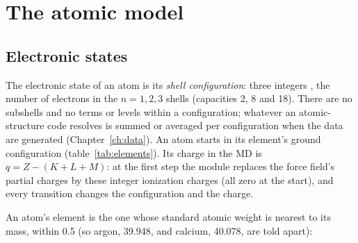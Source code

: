 \chapter{The atomic model}
\label{ch:atomic}

\section{Electronic states}

The electronic state of an atom is its \emph{shell configuration}: three integers , the number of
electrons in the $n=1,2,3$ shells (capacities 2, 8 and 18).
There are no subshells and no terms or levels within a configuration; whatever an atomic-structure code resolves
is summed or averaged per configuration when the data are generated (Chapter~\ref{ch:data}).
An atom starts in its element's ground configuration (table~\ref{tab:elements}).
Its charge in the MD is $q = Z - (K+L+M)$: at the first step the module replaces the force field's partial charges by
these integer ionization charges (all zero at the start), and every transition changes the configuration and the
charge.

An atom's element is the one whose standard atomic weight is nearest to its mass, within 0.5 (so argon, 39.948, and
calcium, 40.078, are told apart):

